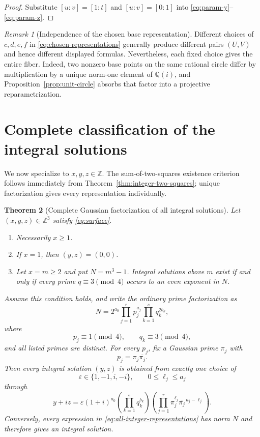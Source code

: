 \documentclass[11pt,a4paper]{article}
\numberwithin{equation}{section}
\newtheorem{theorem}{Theorem}[section]
\theoremstyle{definition}
\theoremstyle{remark}
\newtheorem{remark}[theorem]{Remark}
\newcommand{\Z}{\mathbb Z}
\newcommand{\Q}{\mathbb Q}
\newcommand{\Qi}{\Q(i)}
\begin{document}
\begin{proof}
Substitute $[u:v]=[1:t]$ and $[u:v]=[0:1]$ into \eqref{eq:param-y}--\eqref{eq:param-z}.
\end{proof}

\begin{remark}[Independence of the chosen base representation]
Different choices of $c,d,e,f$ in \eqref{eq:chosen-representations} generally produce different pairs $(U,V)$ and hence different displayed formulas. Nevertheless, each fixed choice gives the entire fiber. Indeed, two nonzero base points on the same rational circle differ by multiplication by a unique norm-one element of $\Qi$, and Proposition~\ref{prop:unit-circle} absorbs that factor into a projective reparametrization.
\end{remark}

\section{Complete classification of the integral solutions}
\label{sec:integer-classification}

We now specialize to $x,y,z\in\Z$. The sum-of-two-squares existence criterion follows immediately from Theorem~\ref{thm:integer-two-squares}; unique factorization gives every representation individually.

\begin{theorem}[Complete Gaussian factorization of all integral solutions]
\label{thm:integer-main}
Let $(x,y,z)\in\Z^3$ satisfy \eqref{eq:surface}.
\begin{enumerate}[label=\textup{(\alph*)}]
 \item Necessarily $x\geq1$.
 \item If $x=1$, then $(y,z)=(0,0)$.
 \item Let $x=m\geq2$ and put $N=m^3-1$. Integral solutions above $m$ exist if and only if every prime $q\equiv3\pmod4$ occurs to an even exponent in $N$.
\end{enumerate}

Assume this condition holds, and write the ordinary prime factorization as
\begin{equation}
 N=2^{a_0}
   \prod_{j=1}^{r}p_j^{a_j}
   \prod_{k=1}^{s}q_k^{2b_k},
 \label{eq:N-admissible-factorization}
\end{equation}
where
\[
 p_j\equiv1\pmod4,
 \qquad
 q_k\equiv3\pmod4,
\]
and all listed primes are distinct. For every $p_j$, fix a Gaussian prime $\pi_j$ with
\[
 p_j=\pi_j\overline{\pi_j}.
\]
Then every integral solution $(y,z)$ is obtained from exactly one choice of
\[
 \varepsilon\in\{1,-1,i,-i\},
 \qquad
 0\leq\ell_j\leq a_j
\]
through
\begin{equation}
 \boxed{
 y+iz=
 \varepsilon(1+i)^{a_0}
 \left(\prod_{k=1}^{s}q_k^{b_k}\right)
 \left(\prod_{j=1}^{r}
  \pi_j^{\ell_j}
  \overline{\pi_j}^{\,a_j-\ell_j}
 \right).}
 \label{eq:all-integer-representations}
\end{equation}
Conversely, every expression in \eqref{eq:all-integer-representations} has norm $N$ and therefore gives an integral solution.
\end{theorem}
\end{document}
